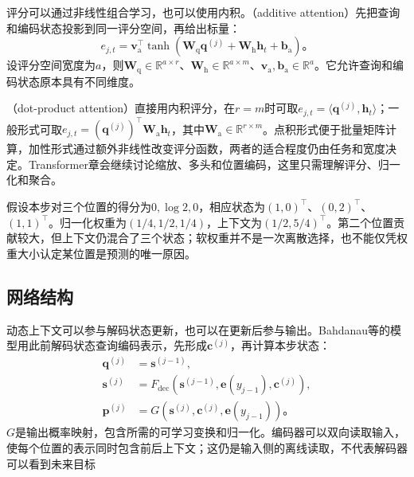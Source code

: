 评分可以通过非线性组合学习，也可以使用内积。（additive attention）先把查询和编码状态投影到同一评分空间，再给出标量：
\begin{equation}
  e_{j,t}=\bm{v}_{\mathrm{a}}^{\top}\tanh\!\left(
     \bm{W}_{\mathrm{q}}\bm{q}^{(j)}
     +\bm{W}_{\mathrm{h}}\bm{h}_t+\bm{b}_{\mathrm{a}}\right)\text{。}
  \label{eq:rnn-additive-attention}
\end{equation}
设评分空间宽度为$a$，则$\bm{W}_{\mathrm{q}}\in\mathbb{R}^{a\times r}$、$\bm{W}_{\mathrm{h}}\in\mathbb{R}^{a\times m}$、$\bm{v}_{\mathrm{a}},\bm{b}_{\mathrm{a}}\in\mathbb{R}^{a}$。它允许查询和编码状态原本具有不同维度。

（dot-product attention）直接用内积评分，在$r=m$时可取$e_{j,t}=\langle\bm{q}^{(j)},\bm{h}_t\rangle$；一般形式可取$e_{j,t}=(\bm{q}^{(j)})^{\top}\bm{W}_{\mathrm{a}}\bm{h}_t$，其中$\bm{W}_{\mathrm{a}}\in\mathbb{R}^{r\times m}$。点积形式便于批量矩阵计算，加性形式通过额外非线性改变评分函数，两者的适合程度仍由任务和宽度决定。Transformer章会继续讨论缩放、多头和位置编码，这里只需理解评分、归一化和聚合。

\begin{example}[权重与上下文]
  \label{ex:rnn-attention-context}
  假设本步对三个位置的得分为$0,\log2,0$，相应状态为$(1,0)^{\top}$、$(0,2)^{\top}$、$(1,1)^{\top}$。归一化权重为$(1/4,1/2,1/4)$，上下文为$(1/2,5/4)^{\top}$。第二个位置贡献较大，但上下文仍混合了三个状态；软权重并不是一次离散选择，也不能仅凭权重大小认定某位置是预测的唯一原因。
\end{example}

\subsection{网络结构}
\label{sec:rnn-attentive-architecture}

动态上下文可以参与解码状态更新，也可以在更新后参与输出。Bahdanau等的模型用此前解码状态查询编码表示，先形成$\bm{c}^{(j)}$，再计算本步状态：
\begin{equation}
  \begin{aligned}
    \bm{q}^{(j)}&=\bm{s}^{(j-1)},\\
    \bm{s}^{(j)}&=F_{\mathrm{dec}}\!\left(
      \bm{s}^{(j-1)},\bm{e}(y_{j-1}),\bm{c}^{(j)}\right),\\
    \bm{p}^{(j)}&=G\!\left(\bm{s}^{(j)},\bm{c}^{(j)},\bm{e}(y_{j-1})\right)\text{。}
  \end{aligned}
  \label{eq:rnn-bahdanau-order}
\end{equation}
$G$是输出概率映射，包含所需的可学习变换和归一化。编码器可以双向读取输入，使每个位置的表示同时包含前后上下文；这仍是输入侧的离线读取，不代表解码器可以看到未来目标


